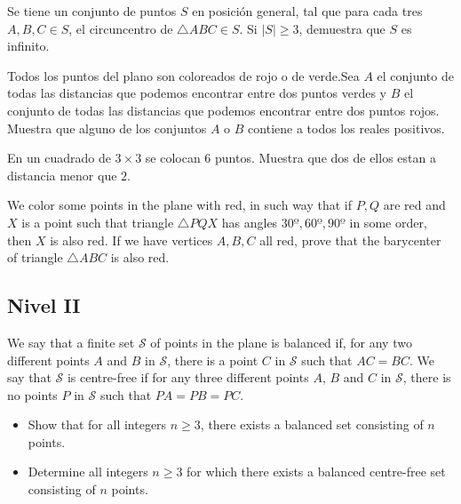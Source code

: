 \documentclass[11pt]{scrartcl}
\begin{document}
\begin{problem}
    Se tiene un conjunto de puntos $ S $ en posición general, tal que para cada tres $A,B,C \in S$, el circuncentro de $\triangle ABC \in S$. Si $|S|\geq 3$, demuestra que $S$ es infinito.
\end{problem}

\begin{problem}
    Todos los puntos del plano son coloreados de rojo o de verde.Sea $A$ el conjunto de
todas las distancias que podemos encontrar entre dos puntos verdes y $B$ el conjunto
de todas las distancias que podemos encontrar entre dos puntos rojos. Muestra
que alguno de los conjuntos $A$ o $B$ contiene a todos los reales positivos.
\end{problem}

\begin{problem}
    En un cuadrado de $3\times 3$ se colocan 6 puntos. Muestra que dos de ellos estan a distancia menor que $2$.
\end{problem}

\begin{problem} %
    We color some points in the plane with red, in such way that if $P,Q$ are red and $X$ is a point such that triangle $\triangle PQX$ has angles $30º, 60º, 90º$ in some order, then $X$ is also red. If we have vertices $A, B, C$ all red, prove that the barycenter of triangle $\triangle ABC$ is also red.
\end{problem}


\subsection{Nivel II}
\begin{problem} %
    We say that a finite set $\mathcal{S}$ of points in the plane is balanced if, for any two different points $A$ and $B$ in $\mathcal{S}$, there is a point $C$ in $\mathcal{S}$ such that $AC=BC$. We say that $\mathcal{S}$ is centre-free if for any three different points $A$, $B$ and $C$ in $\mathcal{S}$, there is no points $P$ in $\mathcal{S}$ such that $PA=PB=PC$.
\begin{itemize}
   
\item  Show that for all integers $n\ge 3$, there exists a balanced set consisting of $n$ points.

\item Determine all integers $n\ge 3$ for which there exists a balanced centre-free set consisting of $n$ points.
  
\end{itemize}
\end{problem}
\end{document}
